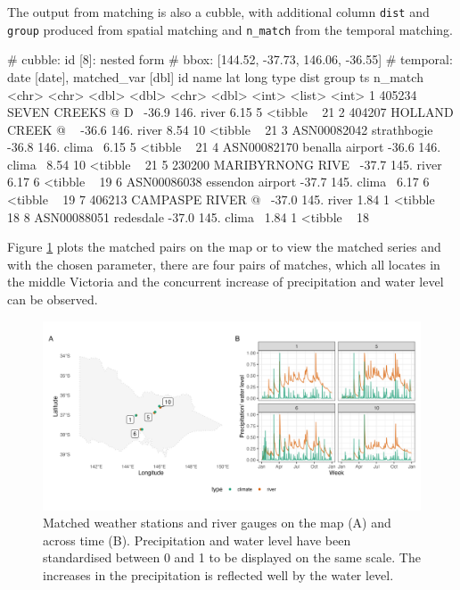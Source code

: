 \documentclass[
]{jss}
\begin{document}
The output from matching is also a cubble, with additional column
\texttt{dist} and \texttt{group} produced from spatial matching and
\texttt{n\_match} from the temporal matching.

\begin{CodeChunk}
\begin{CodeOutput}
# cubble:   id [8]: nested form
# bbox:     [144.52, -37.73, 146.06, -36.55]
# temporal: date [date], matched_var [dbl]
  id          name                lat  long type    dist group ts        n_match
  <chr>       <chr>             <dbl> <dbl> <chr>  <dbl> <int> <list>      <int>
1 405234      SEVEN CREEKS @ D~ -36.9  146. river   6.15     5 <tibble ~      21
2 404207      HOLLAND CREEK @ ~ -36.6  146. river   8.54    10 <tibble ~      21
3 ASN00082042 strathbogie       -36.8  146. clima~  6.15     5 <tibble ~      21
4 ASN00082170 benalla airport   -36.6  146. clima~  8.54    10 <tibble ~      21
5 230200      MARIBYRNONG RIVE~ -37.7  145. river   6.17     6 <tibble ~      19
6 ASN00086038 essendon airport  -37.7  145. clima~  6.17     6 <tibble ~      19
7 406213      CAMPASPE RIVER @~ -37.0  145. river   1.84     1 <tibble ~      18
8 ASN00088051 redesdale         -37.0  145. clima~  1.84     1 <tibble ~      18
\end{CodeOutput}
\end{CodeChunk}

Figure \ref{fig:matching} plots the matched pairs on the map or to view
the matched series and with the chosen parameter, there are four pairs
of matches, which all locates in the middle Victoria and the concurrent
increase of precipitation and water level can be observed.

\begin{CodeChunk}
\begin{figure}

{\centering \includegraphics[width=1\linewidth]{figures/matching} 

}

\caption[Matched weather stations and river gauges on the map (A) and across time (B)]{Matched weather stations and river gauges on the map (A) and across time (B). Precipitation and water level have been standardised between 0 and 1 to be displayed on the same scale. The increases in the precipitation is reflected well by the water level.}\label{fig:matching}
\end{figure}
\end{CodeChunk}
\end{document}
